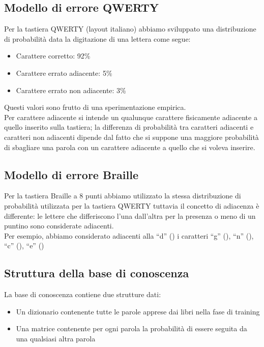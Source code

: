 \documentclass[a4paper,11pt]{article}
\begin{document}
	\subsection{Modello di errore QWERTY}
    	Per la tastiera QWERTY (layout italiano) abbiamo sviluppato una distribuzione di probabilità data la digitazione di una lettera
        come segue:
        \begin{itemize}
        	\item Carattere corretto: 92\%
            \item Carattere errato adiacente: 5\%
            \item Carattere errato non adiacente: 3\%
		\end{itemize}
        Questi valori sono frutto di una sperimentazione empirica.\\
       Per carattere adiacente si intende un qualunque carattere fisicamente adiacente a quello inserito sulla tastiera; la differenza di probabilità
       tra caratteri adiacenti e caratteri non adiacenti dipende dal fatto che si suppone una maggiore probabilità di sbagliare una parola con un
       carattere adiacente a quello che si voleva inserire.
	\subsection{Modello di errore Braille}
    	Per la tastiera Braille a 8 punti abbiamo utilizzato la stessa distribuzione di probabilità utilizzata per la tastiera QWERTY tuttavia
        il concetto di adiacenza è differente:
        le lettere che differiscono l’una dall’altra per la presenza o meno di un 
		puntino sono considerate adiacenti.\\ 
        Per esempio, abbiamo considerato adiacenti alla “d” () i caratteri “g” (), “n” (),  “c” (), “e” 
		() 
        
	\subsection{Struttura della base di conoscenza}
    	La base di conoscenza contiene due strutture dati:
        \begin{itemize}
        	\item Un dizionario contenente tutte le parole apprese dai libri nella fase di training
            \item Una matrice contenente per ogni parola la probabilità di essere seguita da una qualsiasi altra parola
        \end{itemize}
\end{document}
